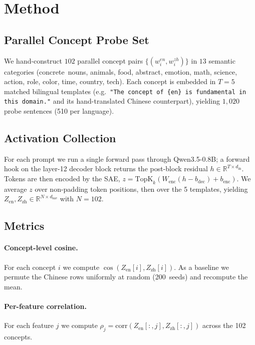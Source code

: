 \documentclass[11pt,a4paper]{article}
\begin{document}
\section{Method}

\subsection{Parallel Concept Probe Set}

We hand-construct $102$ parallel concept pairs $\{(w_i^{en}, w_i^{zh})\}$ in
$13$ semantic categories (concrete~nouns, animals, food, abstract, emotion,
math, science, action, role, color, time, country, tech). Each concept is
embedded in $T=5$ matched bilingual templates (e.g.\ \texttt{"The concept of
\{en\} is fundamental in this domain."} and its hand-translated Chinese
counterpart), yielding $1{,}020$ probe sentences (510 per language).

\subsection{Activation Collection}

For each prompt we run a single forward pass through Qwen3.5-0.8B; a
forward hook on the layer-12 decoder block returns the post-block residual
$h \in \mathbb{R}^{T\times d_\text{in}}$. Tokens are then encoded by the
SAE, $z = \text{TopK}_k(W_\text{enc}(h - b_\text{dec}) + b_\text{enc})$. We
average $z$ over non-padding token positions, then over the 5 templates,
yielding $Z_\text{en}, Z_\text{zh} \in \mathbb{R}^{N\times d_\text{sae}}$ with
$N{=}102$.

\subsection{Metrics}

\paragraph{Concept-level cosine.} For each concept $i$ we compute
$\cos(Z_\text{en}[i], Z_\text{zh}[i])$. As a baseline we permute the Chinese
rows uniformly at random (200~seeds) and recompute the mean.

\paragraph{Per-feature correlation.} For each feature $j$ we compute
$\rho_j = \mathrm{corr}(Z_\text{en}[:,j], Z_\text{zh}[:,j])$ across the 102
concepts.
\end{document}
